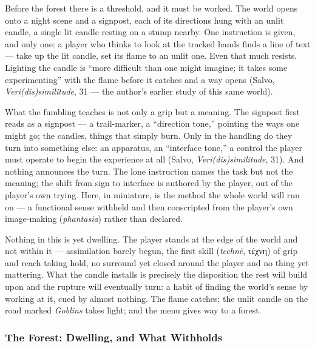 \documentclass{article}
\newcommand{\gk}[1]{{\greekfont #1}}
\begin{document}
Before the forest there is a threshold, and it must be worked. The world opens onto a night scene and a signpost, each of its directions hung with an unlit candle, a single lit candle resting on a stump nearby. One instruction is given, and only one: a player who thinks to look at the tracked hands finds a line of text — take up the lit candle, set its flame to an unlit one. Even that much resists. Lighting the candle is ``more difficult than one might imagine; it takes some experimenting'' with the flame before it catches and a way opens (Salvo, \textit{Veri(dis)similitude}, 31 — the author's earlier study of this same world).

What the fumbling teaches is not only a grip but a meaning. The signpost first reads as a signpost — a trail-marker, a ``direction tone,'' pointing the ways one might go; the candles, things that simply burn. Only in the handling do they turn into something else: an apparatus, an ``interface tone,'' a control the player must operate to begin the experience at all (Salvo, \textit{Veri(dis)similitude}, 31). And nothing announces the turn. The lone instruction names the task but not the meaning; the shift from sign to interface is authored by the player, out of the player's own trying. Here, in miniature, is the method the whole world will run on — a functional sense withheld and then conscripted from the player's own image-making (\textit{phantasia}) rather than declared.

Nothing in this is yet dwelling. The player stands at the edge of the world and not within it — assimilation barely begun, the first skill (\textit{technē}, \gk{τέχνη}) of grip and reach taking hold, no surround yet closed around the player and no thing yet mattering. What the candle installs is precisely the disposition the rest will build upon and the rupture will eventually turn: a habit of finding the world's sense by working at it, cued by almost nothing. The flame catches; the unlit candle on the road marked \textit{Goblins} takes light; and the menu gives way to a forest.

\subsubsection*{The Forest: Dwelling, and What Withholds}
\end{document}
